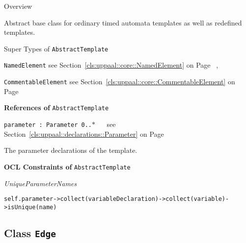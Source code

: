 	\begin{longdescription}
		\item[Overview] 		
				

	

		Abstract base class for ordinary timed automata templates as well as redefined templates.		
		\item[Super Types of \texttt{AbstractTemplate}] ~
			\begin{longdescription}
				\item[\texttt{NamedElement}] see Section~\ref{cls:uppaal::core::NamedElement} on Page~\pageref{cls:uppaal::core::NamedElement}			, 				\item[\texttt{CommentableElement}] see Section~\ref{cls:uppaal::core::CommentableElement} on Page~\pageref{cls:uppaal::core::CommentableElement}						\end{longdescription}
		
	
			\item[\textbf{References of} \texttt{AbstractTemplate}] ~
			\begin{longdescription}
	\item[\texttt{parameter : Parameter 	\symbol{"5B}0..$*$\symbol{"5D}
}] ~
	see Section~\ref{cls:uppaal::declarations::Parameter} on Page~\pageref{cls:uppaal::declarations::Parameter}
	
	\nopagebreak
		
				

	

		The parameter declarations of the template.		
			\end{longdescription}
			\item[\textbf{OCL Constraints of} \texttt{AbstractTemplate}] ~
			\begin{longdescription}
	\item[\small\textit{UniqueParameterNames}] ~ 
	\nopagebreak
	
		\begin{lstlisting}[breaklines=true]
self.parameter->collect(variableDeclaration)->collect(variable)->isUnique(name)		\end{lstlisting}
			\end{longdescription}
	
	\end{longdescription}
	

\subsection{Class \bfseries \texttt{Edge}\normalfont}
\label{cls:uppaal::templates::Edge} 
	
